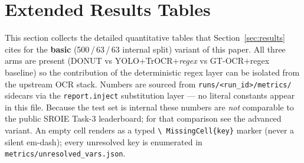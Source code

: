 \section{Extended Results Tables}
\label{sec:results_tables}

This section collects the detailed quantitative tables that
Section~\ref{sec:results} cites for the \textbf{basic} (500\,/\,63\,/\,63 internal
split) variant of this paper.  All three arms are present
(DONUT vs YOLO+TrOCR+\emph{regex} vs GT-OCR$+$regex baseline) so
the contribution of the deterministic regex layer can be isolated
from the upstream OCR stack.  Numbers are sourced from
\texttt{runs/<run\_id>/metrics/} sidecars via the
\texttt{report.inject} substitution layer --- no literal constants
appear in this file.  Because the test set is internal these
numbers are \emph{not} comparable to the public SROIE Task-3
leaderboard; for that comparison see the advanced variant.  An
empty cell renders as a typed \texttt{\textbackslash
MissingCell\{key\}} marker (never a silent em-dash); every
unresolved key is enumerated in
\texttt{metrics/unresolved\_vars.json}.

\begin{table}[t]
\centering
\caption{Headline per-field F1 (\%) on the 63-image internal test
         split.  Three arms: DONUT (end-to-end, $\approx$\,M
         params), YOLO+TrOCR+regex (no learned assigner), and the
         GT-OCR$+$regex baseline that bypasses YOLO+TrOCR by
         feeding SROIE GT box text directly into the same regex
         extractor.  The pairwise $\Delta$F1 between
         pipeline and GT-OCR baseline isolates the
         OCR-quality contribution.}
\label{tab:headline_f1}
\small
{}
\end{table}

\begin{table}[t]
\centering
\caption{Extended per-field metrics (P, R, F1, exact-match) for
         DONUT and the regex pipeline on the 63-image internal
         test set.  Bootstrap CIs are wide ($\pm 0.05$ on F1,
         CI $[\VAR{delta_f1_ci_lo},\,\VAR{delta_f1_ci_hi}]$ on the
         $\Delta$F1 row, McNemar $p=$) --- see
         Section~\ref{sec:limitations}.}
\label{tab:extended}
\scriptsize
{}
\end{table}


